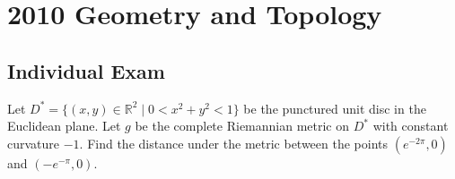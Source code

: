 \section{2010 Geometry and Topology}

\subsection{Individual Exam}

\begin{exercise}
\label{geometry:2010:1}
Let $D^{*} = \{ (x, y) \in \mathbb{R}^{2} \mid 0 < x^{2} + y^{2} < 1 \}$ be the punctured unit disc in the Euclidean plane. Let $g$ be the complete Riemannian metric on $D^{*}$ with constant curvature $-1$. Find the distance under the metric between the points $(e^{-2\pi}, 0)$ and $(-e^{-\pi}, 0)$.
\end{exercise}

